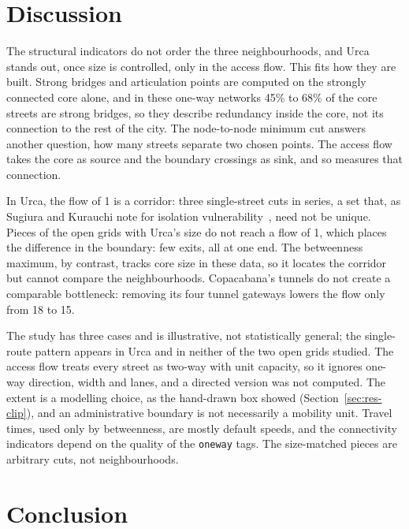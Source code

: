 \documentclass[runningheads]{llncs}
\begin{document}
\section{Discussion}
\label{sec:discussion}

The structural indicators do not order the three neighbourhoods, and Urca stands
out, once size is controlled, only in the access flow. This fits how they are
built. Strong bridges and
articulation points are computed on the strongly connected core alone, and in
these one-way networks 45\% to 68\% of the core streets are strong bridges, so
they describe redundancy inside the core, not its connection to the rest of the
city. The node-to-node minimum cut answers another question, how many streets
separate two chosen points. The access flow takes the core as source and the
boundary crossings as sink, and so measures that connection.

In Urca, the flow of 1 is a corridor: three single-street cuts in series, a set
that, as Sugiura and Kurauchi note for isolation
vulnerability~\cite{sugiura2023isolation}, need not be unique. Pieces of the
open grids with Urca's size do not reach a flow of 1, which places the
difference in the boundary: few exits, all at one end. The betweenness maximum,
by contrast, tracks core size in these data, so it locates the corridor but
cannot compare the neighbourhoods. Copacabana's tunnels do not create a
comparable bottleneck: removing its four tunnel gateways lowers the flow only
from 18 to 15.

The study has three cases and is illustrative, not statistically general; the
single-route pattern appears in Urca and in neither of the two open grids
studied. The access flow treats every street as two-way with unit capacity, so
it ignores one-way direction, width and lanes, and a directed version was not
computed. The extent is a modelling choice, as the hand-drawn box showed
(Section~\ref{sec:res-clip}), and an administrative boundary is not necessarily
a mobility unit. Travel times, used only by betweenness, are mostly default
speeds, and the connectivity indicators depend on the quality of the
\texttt{oneway} tags. The size-matched pieces are arbitrary cuts, not
neighbourhoods.

\FloatBarrier

\section{Conclusion}
\label{sec:conclusion}
\end{document}
